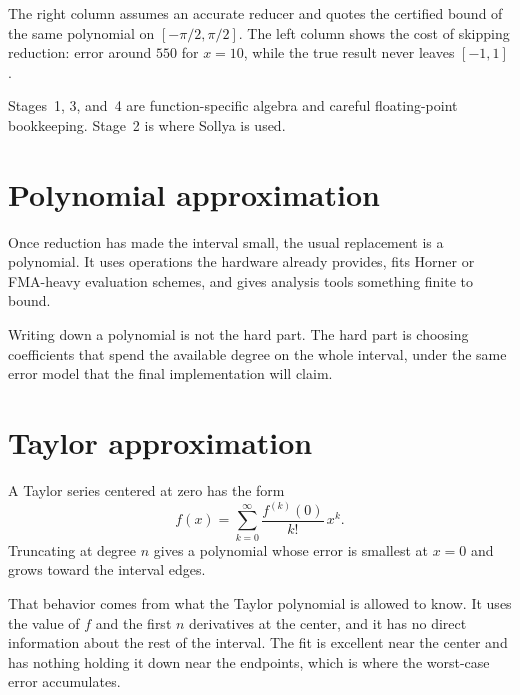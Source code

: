 \documentclass[manuscript, nonacm]{acmart}
\begin{document}
  The right column assumes an accurate reducer and quotes the certified
  bound of the same polynomial on $[-\pi/2, \pi/2]$. The left column shows the
  cost of skipping reduction: error around $550$ for $x = 10$, while the true
  result never leaves $[-1, 1]$.

  Stages~1, 3, and~4 are function-specific algebra and careful
  floating-point bookkeeping. Stage~2 is where Sollya is used.



  \section{Polynomial approximation}

  Once reduction has made the interval small, the usual replacement is a
  polynomial. It uses operations the hardware already provides, fits Horner or
  FMA-heavy evaluation schemes, and gives analysis tools something finite to
  bound.

  Writing down a polynomial is not the hard part. The hard part is choosing
  coefficients that spend the available degree on the whole interval, under the
  same error model that the final implementation will claim.



  \section{Taylor approximation}

  A Taylor series centered at zero has the form
  \[
    f(x) = \sum_{k=0}^{\infty} \frac{f^{(k)}(0)}{k!}\, x^k.
  \]
  Truncating at degree $n$ gives a polynomial whose error is smallest at $x = 0$
  and grows toward the interval edges.

  That behavior comes from what the Taylor polynomial is allowed to know. It
  uses the value of $f$ and the first $n$ derivatives at the center, and it has
  no direct information about the rest of the interval. The fit is excellent
  near the center and has nothing holding it down near the endpoints, which is
  where the worst-case error accumulates.
\end{document}
